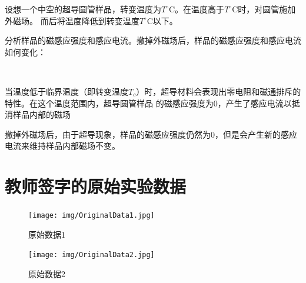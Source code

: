 \documentclass[UTF8]{ctexart}
\begin{document}
    设想一个中空的超导圆管样品，转变温度为$T^{\circ}$C。在温度高于$T^{\circ}$C时，对圆管施加外磁场。
    而后将温度降低到转变温度$T^{\circ}$C以下。

    分析样品的磁感应强度和感应电流。撤掉外磁场后，样品的磁感应强度和感应电流如何变化：

    ~

    当温度低于临界温度（即转变温度$T_c$）时，超导材料会表现出零电阻和磁通排斥的特性。在这个温度范围内，超导圆管样品
    的磁感应强度为0，产生了感应电流以抵消样品内部的磁场

    撤掉外磁场后，由于超导现象，样品的磁感应强度仍然为0，但是会产生新的感应电流来维持样品内部磁场不变。

\newpage
\section{教师签字的原始实验数据}
    \begin{center}
        \begin{figure}[H] %
            \centering %
            \texttt{[image: img/OriginalData1.jpg]} %
            \caption{原始数据1} %
            \label{原始数据-1} %
        \end{figure}
        \begin{figure}[H] %
            \centering %
            \texttt{[image: img/OriginalData2.jpg]} %
            \caption{原始数据2} %
            \label{原始数据-2} %
        \end{figure}
    \end{center}
\end{document}
